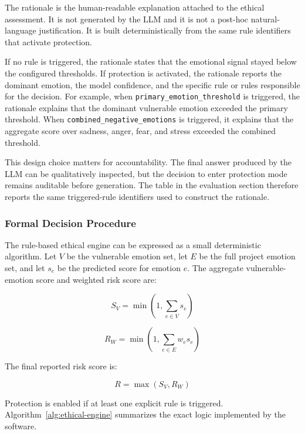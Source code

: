 \documentclass[11pt,a4paper]{article}
\newcommand{\code}[1]{\texttt{#1}}
\begin{document}
The rationale is the human-readable explanation attached to the ethical assessment. It is
not generated by the LLM and it is not a post-hoc natural-language justification. It is built
deterministically from the same rule identifiers that activate protection.

If no rule is triggered, the rationale states that the emotional signal stayed below the
configured thresholds. If protection is activated, the rationale reports the dominant
emotion, the model confidence, and the specific rule or rules responsible for the decision.
For example, when \code{primary\_emotion\_threshold} is triggered, the rationale explains
that the dominant vulnerable emotion exceeded the primary threshold. When
\code{combined\_negative\_emotions} is triggered, it explains that the aggregate score over
sadness, anger, fear, and stress exceeded the combined threshold.

This design choice matters for accountability. The final answer produced by the LLM can be
qualitatively inspected, but the decision to enter protection mode remains auditable before
generation. The table in the evaluation section therefore reports the same triggered-rule
identifiers used to construct the rationale.

\subsubsection{Formal Decision Procedure}

The rule-based ethical engine can be expressed as a small deterministic algorithm. Let
\(V\) be the vulnerable emotion set, let \(E\) be the full project emotion set, and let
\(s_e\) be the predicted score for emotion \(e\). The aggregate vulnerable-emotion score
and weighted risk score are:

\[
S_V = \min\left(1, \sum_{e \in V} s_e\right)
\]

\[
R_W = \min\left(1, \sum_{e \in E} w_e s_e\right)
\]

The final reported risk score is:

\[
R = \max(S_V, R_W)
\]

Protection is enabled if at least one explicit rule is triggered. Algorithm~\ref{alg:ethical-engine}
summarizes the exact logic implemented by the software.
\end{document}
